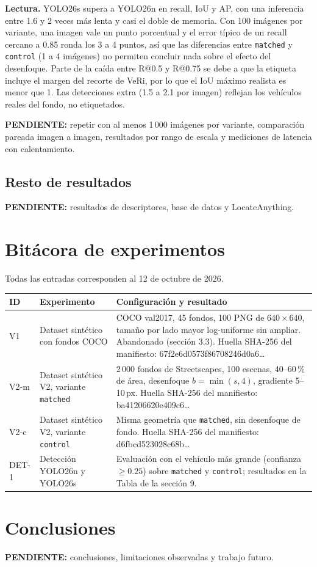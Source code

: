 \documentclass[11pt,a4paper]{article}
\newcommand{\pend}[1]{\textbf{PENDIENTE:} #1}
\begin{document}
\textbf{Lectura.} YOLO26s supera a YOLO26n en recall, IoU y AP, con una inferencia entre 1.6
y 2 veces m\'as lenta y casi el doble de memoria. Con 100 im\'agenes por variante, una
imagen vale un punto porcentual y el error t\'ipico de un recall cercano a 0.85 ronda los 3
a 4 puntos, as\'i que las diferencias entre \texttt{matched} y \texttt{control} (1 a 4
im\'agenes) no permiten concluir nada sobre el efecto del desenfoque. Parte de la ca\'ida
entre R@0.5 y R@0.75 se debe a que la etiqueta incluye el margen del recorte de VeRi, por lo
que el IoU m\'aximo realista es menor que 1. Las detecciones extra (1.5 a 2.1 por imagen)
reflejan los veh\'iculos reales del fondo, no etiquetados.

\pend{repetir con al menos 1\,000 im\'agenes por variante, comparaci\'on pareada imagen a
imagen, resultados por rango de escala y mediciones de latencia con calentamiento.}

\subsection{Resto de resultados}
\pend{resultados de descriptores, base de datos y LocateAnything.}

\section{Bit\'acora de experimentos}

Todas las entradas corresponden al 12 de octubre de 2026.

{\small
\begin{longtable}{@{}p{1.8cm}p{4.2cm}p{9.5cm}@{}}
\toprule
ID & Experimento & Configuraci\'on y resultado \\
\midrule
\endhead
V1 & Dataset sint\'etico con fondos COCO & COCO val2017, 45 fondos, 100 PNG de $640\times640$, tama\~no por lado mayor log-uniforme sin ampliar. Abandonado (secci\'on 3.3). Huella SHA-256 del manifiesto: 67f2e6d0573f86708246d0a6\ldots \\
V2-m & Dataset sint\'etico V2, variante \texttt{matched} & 2\,000 fondos de Streetscapes, 100 escenas, 40--60\,\% de \'area, desenfoque $b=\min(s,4)$, gradiente 5--10\,px. Huella SHA-256 del manifiesto: ba41206620e409c6\ldots \\
V2-c & Dataset sint\'etico V2, variante \texttt{control} & Misma geometr\'ia que \texttt{matched}, sin desenfoque de fondo. Huella SHA-256 del manifiesto: d6fbcd523028c68b\ldots \\
DET-1 & Detecci\'on YOLO26n y YOLO26s & Evaluaci\'on con el veh\'iculo m\'as grande (confianza $\geq 0.25$) sobre \texttt{matched} y \texttt{control}; resultados en la Tabla de la secci\'on 9. \\
\bottomrule
\end{longtable}
}

\section{Conclusiones}

\pend{conclusiones, limitaciones observadas y trabajo futuro.}
\end{document}
